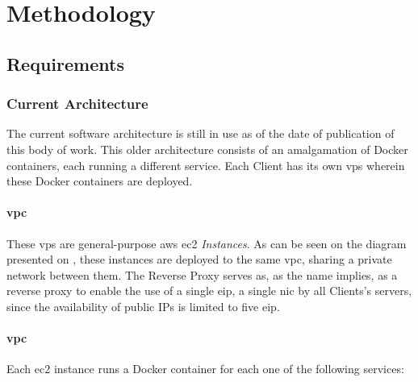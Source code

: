 \chapter{Methodology}
\label{methodology}

\section{Requirements}
\label{methodology:s:requirements}

\subsection{Current Architecture}
\label{methodology:ss:current-architecture}

The current software architecture is still in use as of the date of publication of this body of work. This older architecture consists of an amalgamation of Docker containers, each running a different service. Each Client has its own \gls{vps} wherein these Docker containers are deployed. 

\subsubsection{\gls{vpc}}
\label{methodology:sss:vpc}

These \gls{vps} are general-purpose \gls{aws} \gls{ec2} \textit{Instances}. As can be seen on the diagram presented on , these instances are deployed to the same \gls{vpc}, sharing a private network between them. The Reverse Proxy serves as, as the name implies, as a reverse proxy to enable the use of a single \gls{eip}, a single \gls{nic} by all Clients's servers, since the availability of public IPs is limited to five \gls{eip}.


\subsubsection{\gls{vpc}}
\label{methodology:sss:vpc}

Each \gls{ec2} instance runs a Docker container for each one of the following services:

